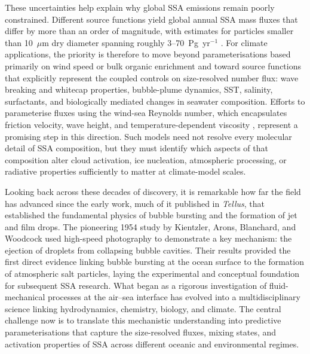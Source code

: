 \documentclass[ProofPDF]{./Styles/Jnls-Template-V3}
\begin{document}
These uncertainties help explain why global SSA emissions remain poorly constrained. Different source functions yield global annual SSA mass fluxes that differ by more than an order of magnitude, with estimates for particles smaller than 10~$\mu$m dry diameter spanning roughly 3--70~Pg~yr$^{-1}$ \citep{Grythe2014}. For climate applications, the priority is therefore to move beyond parameterisations based primarily on wind speed or bulk organic enrichment and toward source functions that explicitly represent the coupled controls on size-resolved number flux: wave breaking and whitecap properties, bubble-plume dynamics, SST, salinity, surfactants, and biologically mediated changes in seawater composition. Efforts to parameterise fluxes using the wind-sea Reynolds number, which encapsulates friction velocity, wave height, and temperature-dependent viscosity \citep{Ovadnevaite2014}, represent a promising step in this direction. Such models need not resolve every molecular detail of SSA composition, but they must identify which aspects of that composition alter cloud activation, ice nucleation, atmospheric processing, or radiative properties sufficiently to matter at climate-model scales.

Looking back across these decades of discovery, it is remarkable how far the field has advanced since the early work, much of it published in \textit{Tellus}, that established the fundamental physics of bubble bursting and the formation of jet and film drops. The pioneering 1954 study by Kientzler, Arons, Blanchard, and Woodcock used high-speed photography to demonstrate a key mechanism: the ejection of droplets from collapsing bubble cavities. Their results provided the first direct evidence linking bubble bursting at the ocean surface to the formation of atmospheric salt particles, laying the experimental and conceptual foundation for subsequent SSA research. What began as a rigorous investigation of fluid-mechanical processes at the air--sea interface has evolved into a multidisciplinary science linking hydrodynamics, chemistry, biology, and climate. The central challenge now is to translate this mechanistic understanding into predictive parameterisations that capture the size-resolved fluxes, mixing states, and activation properties of SSA across different oceanic and environmental regimes.
\end{document}
